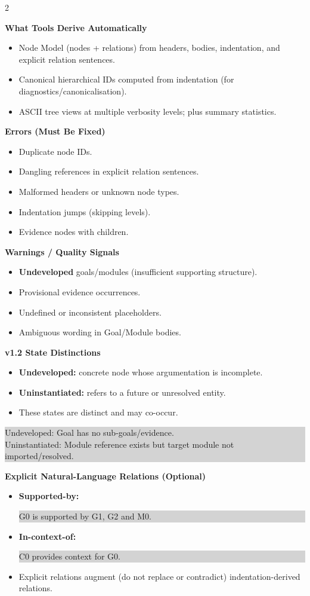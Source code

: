 \documentclass[10pt,letterpaper]{article}
\newcommand{\Sec}[1]{%
  \vspace{5pt}%
  \noindent{\color{RuleGray}\rule{\linewidth}{0.35pt}}\par
  \vspace{2pt}%
  {\bfseries #1}\par
  \vspace{2pt}%
}
\newcommand{\Example}[1]{%
  \vspace{1pt}%
  \noindent\colorbox{LightGray}{%
    \parbox{\linewidth}{\ttfamily\footnotesize\raggedright
#1
    }%
  }%
  \vspace{2pt}%
}
\begin{document}
\begin{multicols*}{2}
\raggedcolumns

\Sec{What Tools Derive Automatically}
\begin{itemize}
  \item Node Model (nodes + relations) from headers, bodies, indentation, and explicit relation sentences.
  \item Canonical hierarchical IDs computed from indentation (for diagnostics/canonicalisation).
  \item ASCII tree views at multiple verbosity levels; plus summary statistics.
\end{itemize}

\Sec{Errors (Must Be Fixed)}
\begin{itemize}
  \item Duplicate node IDs.
  \item Dangling references in explicit relation sentences.
  \item Malformed headers or unknown node types.
  \item Indentation jumps (skipping levels).
  \item Evidence nodes with children.
\end{itemize}

\Sec{Warnings / Quality Signals}
\begin{itemize}
  \item \textbf{Undeveloped} goals/modules (insufficient supporting structure).
  \item Provisional evidence occurrences.
  \item Undefined or inconsistent placeholders.
  \item Ambiguous wording in Goal/Module bodies.
\end{itemize}

\Sec{v1.2 State Distinctions}
\begin{itemize}
  \item \textbf{Undeveloped:} concrete node whose argumentation is incomplete.
  \item \textbf{Uninstantiated:} refers to a future or unresolved entity.
  \item These states are distinct and may co-occur.
\end{itemize}
\Example{Undeveloped: Goal has no sub-goals/evidence.\\
Uninstantiated: Module reference exists but target module not imported/resolved.}

\Sec{Explicit Natural-Language Relations (Optional)}
\begin{itemize}
  \item \textbf{Supported-by:}\\
  \Example{G0 is supported by G1, G2 and M0.}
  \item \textbf{In-context-of:} \\
  \Example{C0 provides context for G0.}
  \item Explicit relations augment (do not replace or contradict) indentation-derived relations.
\end{itemize}


\end{multicols*}
\end{document}
